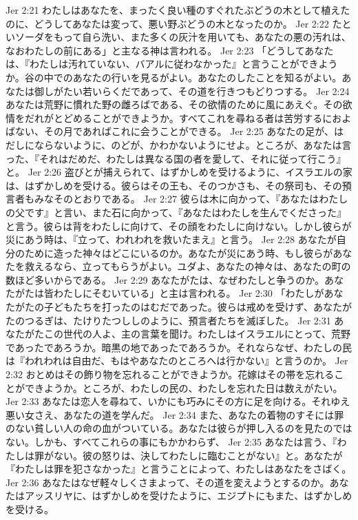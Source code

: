 Jer 2:21  わたしはあなたを、まったく良い種のすぐれたぶどうの木として植えたのに、どうしてあなたは変って、悪い野ぶどうの木となったのか。
Jer 2:22  たといソーダをもって自ら洗い、また多くの灰汁を用いても、あなたの悪の汚れは、なおわたしの前にある」と主なる神は言われる。
Jer 2:23  「どうしてあなたは、『わたしは汚れていない、バアルに従わなかった』と言うことができようか。谷の中でのあなたの行いを見るがよい。あなたのしたことを知るがよい。あなたは御しがたい若いらくだであって、その道を行きつもどりつする。
Jer 2:24  あなたは荒野に慣れた野の雌ろばである、その欲情のために風にあえぐ。その欲情をだれがとどめることができようか。すべてこれを尋ねる者は苦労するにおよばない、その月であればこれに会うことができる。
Jer 2:25  あなたの足が、はだしにならないように、のどが、かわかないようにせよ。ところが、あなたは言った、『それはだめだ、わたしは異なる国の者を愛して、それに従って行こう』と。
Jer 2:26  盗びとが捕えられて、はずかしめを受けるように、イスラエルの家は、はずかしめを受ける。彼らはその王も、そのつかさも、その祭司も、その預言者もみなそのとおりである。
Jer 2:27  彼らは木に向かって、『あなたはわたしの父です』と言い、また石に向かって、『あなたはわたしを生んでくださった』と言う。彼らは背をわたしに向けて、その顔をわたしに向けない。しかし彼らが災にあう時は、『立って、われわれを救いたまえ』と言う。
Jer 2:28  あなたが自分のために造った神々はどこにいるのか。あなたが災にあう時、もし彼らがあなたを救えるなら、立ってもらうがよい。ユダよ、あなたの神々は、あなたの町の数ほど多いからである。
Jer 2:29  あなたがたは、なぜわたしと争うのか。あなたがたは皆わたしにそむいている」と主は言われる。
Jer 2:30  「わたしがあなたがたの子どもたちを打ったのはむだであった。彼らは戒めを受けず、あなたがたのつるぎは、たけりたつししのように、預言者たちを滅ぼした。
Jer 2:31  あなたがたこの世代の人よ、主の言葉を聞け。わたしはイスラエルにとって、荒野であったであろうか。暗黒の地であったであろうか。それならなぜ、わたしの民は『われわれは自由だ、もはやあなたのところへは行かない』と言うのか。
Jer 2:32  おとめはその飾り物を忘れることができようか。花嫁はその帯を忘れることができようか。ところが、わたしの民の、わたしを忘れた日は数えがたい。
Jer 2:33  あなたは恋人を尋ねて、いかにも巧みにその方に足を向ける。それゆえ悪い女さえ、あなたの道を学んだ。
Jer 2:34  また、あなたの着物のすそには罪のない貧しい人の命の血がついている。あなたは彼らが押し入るのを見たのではない。しかも、すべてこれらの事にもかかわらず、
Jer 2:35  あなたは言う、『わたしは罪がない。彼の怒りは、決してわたしに臨むことがない』と。あなたが『わたしは罪を犯さなかった』と言うことによって、わたしはあなたをさばく。
Jer 2:36  あなたはなぜ軽々しくさまよって、その道を変えようとするのか。あなたはアッスリヤに、はずかしめを受けたように、エジプトにもまた、はずかしめを受ける。

